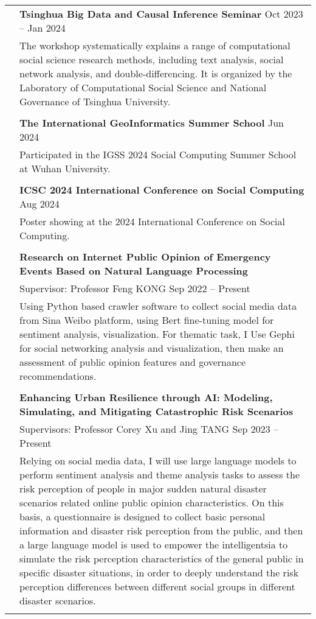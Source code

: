 \documentclass[letterpaper, 11pt]{article}
\begin{document}
\begin{longtable}{p{1.3in}p{4.8in}}

\color{RoyalBlue}{Workshop}
& \textbf{Tsinghua Big Data and Causal Inference Seminar } \hfill Oct 2023 -- Jan 2024 \\
& The workshop systematically explains a range of computational social science research methods, including text analysis, social network analysis, and double-differencing. It is organized by the Laboratory of Computational Social Science and National Governance of Tsinghua University. \\
& \\
& \textbf{The International GeoInformatics Summer School} \hfill Jun 2024 \\
& Participated in the IGSS 2024 Social Computing Summer School at Wuhan University.\\
& \\
& \textbf{ICSC 2024 International Conference on Social Computing} \hfill Aug 2024 \\
& Poster showing at the 2024 International Conference on Social Computing.\\
& \\


\nohyphens{\color{RoyalBlue}{Research Experience}} 
& \textbf{Research on Internet Public Opinion of Emergency Events Based on Natural Language Processing} \\
& Supervisor: Professor Feng KONG  \hfill Sep 2022 -- Present \\
& Using Python based crawler software to collect social media data from Sina Weibo platform, using Bert fine-tuning model for sentiment analysis, visualization. For thematic task, I Use Gephi for social networking analysis and visualization, then make an assessment of public opinion features and governance recommendations. \\
& \\

& \textbf{Enhancing Urban Resilience through AI: Modeling, Simulating, and Mitigating Catastrophic Risk Scenarios
} \\
& Supervisors: Professor Corey Xu and Jing TANG \hfill Sep 2023 -- Present \\
& Relying on social media data, I will use large language models to perform sentiment analysis and theme analysis tasks to assess the risk perception of people in major sudden natural disaster scenarios related online public opinion characteristics. On this basis, a questionnaire is designed to collect basic personal information and disaster risk perception from the public, and then a large language model is used to empower the intelligentsia to simulate the risk perception characteristics of the general public in specific disaster situations, in order to deeply understand the risk perception differences between different social groups in different disaster scenarios.\\
& \\


\end{longtable}
\end{document}

